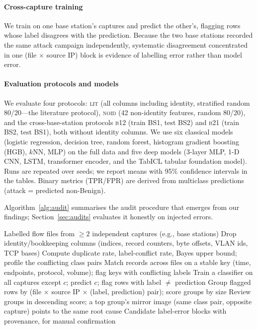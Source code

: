 \documentclass[preprint,12pt]{elsarticle}
\begin{document}
\paragraph{Cross-capture training} We train on one base station's captures and
predict the other's, flagging rows whose label disagrees with the prediction.
Because the two base stations recorded the same attack campaign independently,
systematic disagreement concentrated in one (file $\times$ source IP) block is
evidence of labelling error rather than model error.

\paragraph{Evaluation protocols and models} We evaluate four protocols:
\textsc{lit} (all columns including identity, stratified random 80/20---the
literature protocol), \textsc{noid} (42 non-identity features, random 80/20),
and the cross-base-station protocols \textsc{b12} (train BS1, test BS2) and
\textsc{b21} (train BS2, test BS1), both without identity columns. We use six
classical models (logistic regression, decision tree, random forest,
histogram gradient boosting (HGB), $k$NN, MLP) on the full data and five deep
models (3-layer MLP, 1-D CNN, LSTM, transformer encoder, and the TabICL tabular
foundation model). Runs are repeated over seeds; we report means with 95\%
confidence intervals in the tables. Binary metrics (TPR/FPR) are derived from
multiclass predictions (attack = predicted non-Benign).

Algorithm~\ref{alg:audit} summarises the audit procedure that emerges from our
findings; Section~\ref{sec:audits} evaluates it honestly on injected errors.

\begin{algorithm}[t]
\caption{Block label-error audit for multi-capture IDS datasets}
\label{alg:audit}
\begin{algorithmic}[1]
\Require Labelled flow files from $\geq 2$ independent captures (e.g., base stations)
\State Drop identity/bookkeeping columns (indices, record counters, byte offsets, VLAN ids, TCP bases)
\State Compute duplicate rate, label-conflict rate, Bayes upper bound; profile the conflicting class pairs
\State Match records across files on a stable key (time, endpoints, protocol, volume); flag keys with conflicting labels
  \State Train a classifier on all captures except $c$; predict $c$; flag rows with label $\neq$ prediction
\EndFor
\State Group flagged rows by (file $\times$ source IP $\times$ (label, prediction) pair); score groups by size
\State Review groups in descending score; a top group's mirror image (same class pair, opposite capture) points to the same root cause
\Ensure Candidate label-error blocks with provenance, for manual confirmation
\end{algorithmic}
\end{algorithm}
\end{document}
